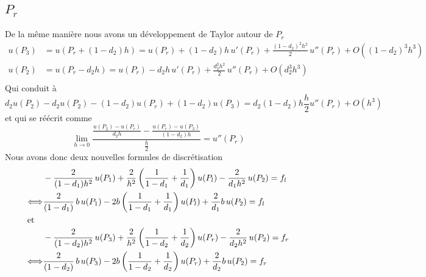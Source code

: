 \documentclass[11pt,a4paper]{article}
\begin{document}
\subsection{$P_r$}
De la même manière nous avons un développement de Taylor autour de $P_r$
\begin{align*}
u \left(P_3\right) &= u \left(P_r+\left(1-d_2\right)h\right) = u \left(P_r\right) + \left(1-d_2\right)h\,u'\left(P_r\right) + \frac{\left(1-d_2\right)^2h^2}{2}\,u''(P_r) + O\left(\left(1-d_2\right)^3h^3\right)\\
u (P_2) &= u \left(P_r-d_2h\right) = u \left(P_r\right) - d_2h\,u'\left(P_r\right) + \frac{d_2^2h^2}{2}\,u''\left(P_r\right) + O\left(d_2^3h^3\right)\\
\end{align*}
Qui conduit à
\begin{equation}
d_2u \left(P_2\right) - d_2u\left(P_2\right) - (1-d_2)u\left(P_r\right) + \left(1-d_2\right) u (P_3) = d_2(1-d_2)h\frac{h}{2}u''\left(P_r\right) + O(h^3)
\end{equation}
et qui se réécrit comme
\begin{equation}
\lim_{h\to0}\frac{\frac{u(P_2)- u (P_r)}{d_2h} - \frac{u (P_r) - u (P_3)}{(1-d_2)h}}{\frac{h}{2}} = u''(P_r)
\end{equation}
Nous avons donc deux nouvelles formules de discrétisation
\begin{align*}
&-\frac{2}{(1-d_1)h^2}\,u(P_1) + \frac{2}{h^2}\left( \frac{1}{1-d_1} + \frac{1}{d_1}\right)u(P_l) - \frac{2}{d_1h^2}\,u(P_2) = f_l\\
\Longleftrightarrow& \frac{2}{(1-d_1)}\,b\,u(P_1) -2b\left(\frac{1}{1-d_1} + \frac{1}{d_1}\right)u(P_l) + \frac{2}{d_1}b\,u(P_2) = f_l\\
\intertext{et}
&-\frac{2}{(1-d_2)h^2}\,u(P_3) + \frac{2}{h^2}\left( \frac{1}{1-d_2} + \frac{1}{d_2}\right)u(P_r) - \frac{2}{d_2h^2}\,u(P_2) = f_r\\
\Longleftrightarrow& \frac{2}{(1-d_2)}\,b\,u(P_3) -2b\left(\frac{1}{1-d_2} + \frac{1}{d_2}\right)u(P_r) + \frac{2}{d_2}b\,u(P_2) = f_r\\
\end{align*}
\end{document}
